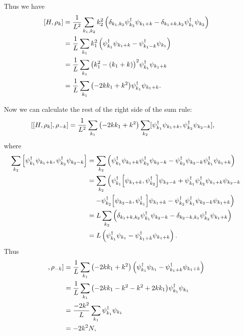 \documentclass[11pt, a4paper]{report} %
\begin{document}
Thus we have
\begin{align}
  \label{eq:13}
  [H, \rho_k] &= \frac{1}{L^2} \sum_{k_1,k_2} k_2^2  \left( \delta_{k_1,k_2} \psi_{k_2}^{\dag}\psi_{k_1+k} -  \delta_{k_1+k,k_2}\psi_{k_1}^{\dag}\psi_{k_2} \right) \\
              &= \frac{1}{L} \sum_{k_1} k_1^2  \left(\psi_{k_1}^{\dag}\psi_{k_1+k} -  \psi_{k_1-k}^{\dag}\psi_{k_1} \right) \\
              &= \frac{1}{L} \sum_{k_1} {\qty(k_1^2 -(k_1+k))}^2 \psi_{k_1}^{\dag}\psi_{k_1+k}\\
              &= \frac{1}{L} \sum_{k_1} \qty(-2kk_1+k^2) \psi_{k_1}^{\dag}\psi_{k_1+k}.
\end{align}

Now we can calculate the rest of the right side of the sum rule:
\begin{align}
  \label{eq:14}
  [[H,\rho_k],\rho_{-k}] &= \frac{1}{L^2} \sum_{k_1}\qty(-2kk_1+k^2) \sum_{k_2} [\psi_{k_1}^{\dag}\psi_{k_1+k}, \psi_{k_2}^{\dag}\psi_{k_2-k}],
\end{align}
where
\begin{align}
  \label{eq:15}
   \sum_{k_2} \qty[\psi_{k_1}^{\dag}\psi_{k_1+k}, \psi_{k_2}^{\dag}\psi_{k_2-k}] &=  \sum_{k_2} \left(\psi_{k_1}^{\dag}\psi_{k_1+k} \psi_{k_2}^{\dag}\psi_{k_2-k} - \psi_{k_2}^{\dag}\psi_{k_2-k}\psi_{k_1}^{\dag}\psi_{k_1+k} \right)\\
                                                                             &= \sum_{k_2} \left(\psi_{k_1}^{\dag}\qty[\psi_{k_1+k}, \psi_{k_2}^{\dag}]\psi_{k_2-k} + \psi_{k_1}^{\dag} \psi_{k_2}^{\dag}\psi_{k_1+k}\psi_{k_2-k} \right.\nonumber\\
&\quad\left. - \psi_{k_2}^{\dag}\qty[\psi_{k_2-k},\psi_{k_1}^{\dag}]\psi_{k_1+k} -\psi_{k_2}^{\dag}\psi_{k_1}^{\dag}\psi_{k_2-k}\psi_{k_1+k} \right) \\
                                                                             &= L\sum_{k_2} \left(\delta_{k_1+k,k_2}\psi_{k_1}^{\dag}\psi_{k_2-k} - \delta_{k_2-k,k_1}\psi_{k_2}^{\dag}\psi_{k_1+k}\right) \\
                                                                             &= L \left(\psi_{k_1}^{\dag}\psi_{k_1} - \psi_{k_1+k}^{\dag}\psi_{k_1+k}\right) .
\end{align}
Thus
\begin{align}
  [[H,\rho_k],\rho_{-k}] &= \frac{1}{L} \sum_{k_1}\qty(-2kk_1+k^2) \left(\psi_{k_1}^{\dag}\psi_{k_1} - \psi_{k_1+k}^{\dag}\psi_{k_1+k}\right) \\
                         &=  \frac{1}{L} \sum_{k_1}\qty(-2kk_1-k^2 -k^2+2kk_1) \psi_{k_1}^{\dag}\psi_{k_1}\\
                         &=  \frac{-2k^2}{L} \sum_{k_1}\psi_{k_1}^{\dag}\psi_{k_1}\\
                         &= -2k^2N,
\end{align}
\end{document}
